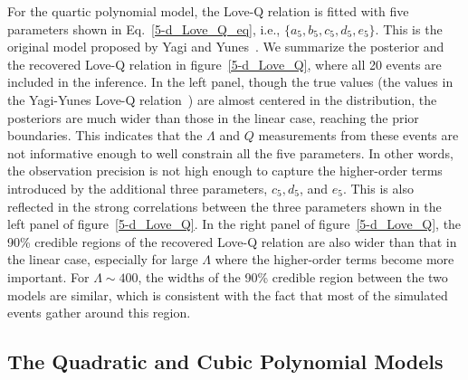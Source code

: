 \documentclass[a4paper,11pt]{article}
\begin{document}

For the quartic polynomial model, the Love-Q relation is fitted with five 
parameters shown in Eq.~\eqref{5-d_Love_Q_eq}, i.e., $\{a_5, b_5, c_5, d_5,
e_5\}$.  This is  the original model proposed by Yagi and
Yunes~\cite{Yagi:2013awa}. We summarize the posterior and the recovered Love-Q
relation in figure~\ref{5-d_Love_Q}, where all 20 events are included in the
inference. In the left panel, though the true values (the values in the
Yagi-Yunes Love-Q relation~\cite{Yagi:2013awa}) are almost centered in the
distribution, the posteriors are much wider than those in the linear case,
reaching the prior boundaries. This indicates that the $\Lambda$ and $Q$
measurements from these events are not informative enough to well constrain all
the five parameters. In other words, the observation precision is not high
enough to capture the higher-order terms introduced by the additional three
parameters, $c_5, d_5$, and $e_5$. This is also reflected in the strong
correlations between the three parameters shown in the left panel of
figure~\ref{5-d_Love_Q}. In the right panel of figure~\ref{5-d_Love_Q}, the 90\%
credible regions of the recovered Love-Q relation are also wider than that in
the linear case, especially for large $\Lambda$ where the higher-order terms
become more important. For $\Lambda \sim 400$, the widths of the 90\% credible
region between the two models are similar, which is consistent with the fact
that most of the simulated events gather around this region. 

\subsection{The Quadratic and Cubic Polynomial Models}
\label{subsec:results_quadratic_cubic}
\end{document}
